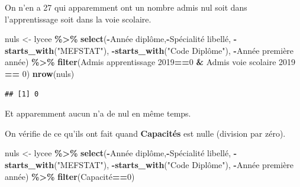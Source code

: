 \documentclass[
]{book}
\newenvironment{Shaded}{\begin{snugshade}}{\end{snugshade}}
\newcommand{\AttributeTok}[1]{\textcolor[rgb]{0.13,0.29,0.53}{#1}}
\newcommand{\DecValTok}[1]{\textcolor[rgb]{0.00,0.00,0.81}{#1}}
\newcommand{\FunctionTok}[1]{\textcolor[rgb]{0.13,0.29,0.53}{\textbf{#1}}}
\newcommand{\NormalTok}[1]{#1}
\newcommand{\OtherTok}[1]{\textcolor[rgb]{0.56,0.35,0.01}{#1}}
\newcommand{\SpecialCharTok}[1]{\textcolor[rgb]{0.81,0.36,0.00}{\textbf{#1}}}
\newcommand{\StringTok}[1]{\textcolor[rgb]{0.31,0.60,0.02}{#1}}
\begin{document}
On n'en a 27 qui apparemment ont un nombre admis nul soit dans l'apprentissage soit
dans la voie scolaire.

\begin{Shaded}
\begin{Highlighting}[]
\NormalTok{nuls }\OtherTok{\textless{}{-}}\NormalTok{ lycee }\SpecialCharTok{\%\textgreater{}\%} \FunctionTok{select}\NormalTok{(}\SpecialCharTok{{-}}\StringTok{\textasciigrave{}}\AttributeTok{Année diplôme}\StringTok{\textasciigrave{}}\NormalTok{,}\SpecialCharTok{{-}}\StringTok{\textasciigrave{}}\AttributeTok{Spécialité libellé}\StringTok{\textasciigrave{}}\NormalTok{,}
                 \SpecialCharTok{{-}}\FunctionTok{starts\_with}\NormalTok{(}\StringTok{"MEFSTAT"}\NormalTok{),}
                 \SpecialCharTok{{-}}\FunctionTok{starts\_with}\NormalTok{(}\StringTok{"Code Diplôme"}\NormalTok{),}
                 \SpecialCharTok{{-}}\StringTok{\textasciigrave{}}\AttributeTok{Année première année}\StringTok{\textasciigrave{}}\NormalTok{) }\SpecialCharTok{\%\textgreater{}\%} 
  \FunctionTok{filter}\NormalTok{(}\StringTok{\textasciigrave{}}\AttributeTok{Admis apprentissage 2019}\StringTok{\textasciigrave{}}\SpecialCharTok{==}\DecValTok{0} \SpecialCharTok{\&} \StringTok{\textasciigrave{}}\AttributeTok{Admis voie scolaire 2019}\StringTok{\textasciigrave{}} \SpecialCharTok{==} \DecValTok{0}\NormalTok{)}
\FunctionTok{nrow}\NormalTok{(nuls)}
\end{Highlighting}
\end{Shaded}

\begin{verbatim}
## [1] 0
\end{verbatim}

Et apparemment aucun n'a de nul en même temps.

On vérifie de ce qu'ils ont fait quand \textbf{Capacités} est nulle (division par zéro).

\begin{Shaded}
\begin{Highlighting}[]
\NormalTok{nuls }\OtherTok{\textless{}{-}}\NormalTok{ lycee }\SpecialCharTok{\%\textgreater{}\%} \FunctionTok{select}\NormalTok{(}\SpecialCharTok{{-}}\StringTok{\textasciigrave{}}\AttributeTok{Année diplôme}\StringTok{\textasciigrave{}}\NormalTok{,}\SpecialCharTok{{-}}\StringTok{\textasciigrave{}}\AttributeTok{Spécialité libellé}\StringTok{\textasciigrave{}}\NormalTok{,}
                 \SpecialCharTok{{-}}\FunctionTok{starts\_with}\NormalTok{(}\StringTok{"MEFSTAT"}\NormalTok{),}
                 \SpecialCharTok{{-}}\FunctionTok{starts\_with}\NormalTok{(}\StringTok{"Code Diplôme"}\NormalTok{),}
                 \SpecialCharTok{{-}}\StringTok{\textasciigrave{}}\AttributeTok{Année première année}\StringTok{\textasciigrave{}}\NormalTok{) }\SpecialCharTok{\%\textgreater{}\%} 
  \FunctionTok{filter}\NormalTok{(}\StringTok{\textasciigrave{}}\AttributeTok{Capacité}\StringTok{\textasciigrave{}}\SpecialCharTok{==}\DecValTok{0}\NormalTok{)}
\end{Highlighting}
\end{Shaded}
\end{document}
